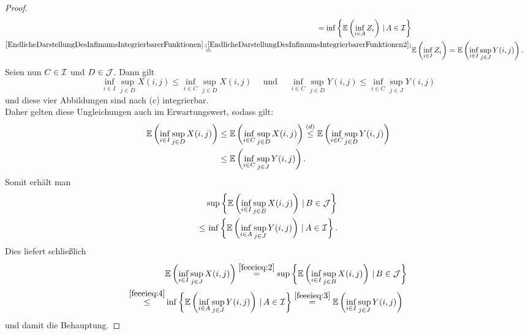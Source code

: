\begin{proof}
\begin{align}
= \inf\menge{\E\left(\inf_{i \in A}Z_i \right)}{A \in \mci}\notag\\
\overset{\refclaim{EndlicheDarstellungDesInfimumsIntegrierbarerFunktionen}
{EndlicheDarstellungDesInfimumsIntegrierbarerFunktionen2}}=&
\E\left(\inf_{i\in I}Z_i\right)=\E\left(\inf_{i\in I}\sup_{j\in J}Y(i,j)\right)
\text.\label{feeeieq:3}
\end{align}
Seien nun $C \in \mathcal{I}$ und $D \in \mathcal{J}$. Dann gilt
\[ \inf_{i \in I}\sup_{j \in D}X(i, j) \le \inf_{i \in C}\sup_{j \in D}X(i,j)
\quad \text{ und }\quad  
\inf_{i\in C}\sup_{j\in D}Y(i,j)\le \inf_{i \in C}\sup_{j \in J}Y(i, j)\]
und diese vier Abbildungen sind nach (c) integrierbar.\\
Daher gelten diese Ungleichungen auch im Erwartungswert, sodass gilt:
\begin{align*}
\mathbb{E}\left(\inf_{i \in I}\sup_{j \in D}X(i, j) \right) & \le
\mathbb{E}\left(\inf_{i \in C}\sup_{j \in D}X(i, j) \right) \overset{(d)}\le
\mathbb{E}\left(\inf_{i \in C}\sup_{j \in D}Y(i, j) \right)\\
&\le \mathbb{E}\left(\inf_{i \in C}\sup_{j \in J}Y(i, j) \right)\text.
\end{align*}
Somit erhält man
\begin{align}
&
\sup\left\{\mathbb{E}\left(\inf_{i\in I}\sup_{j\in B}X(i,j)\right)\,|\,B \in \mathcal{J}\right\}\notag\\
\le&\, \inf\left\{\mathbb{E}\left(\inf_{i\in A}\sup_{j\in J}Y(i,j)\right)\,|\,A\in\mathcal{I}\right\}
 \text. \label{feeeieq:4}\end{align}
Dies liefert schließlich
\begin{align*}
& \mathbb{E}\left(\inf_{i\in I}\sup_{j\in J}X(i,j)\right) \overset{\eqref{feeeieq:2}}=
\sup\left\{\mathbb{E}\left(\inf_{i \in I}\sup_{j \in B}X(i, j) \right)\,|\,B \in \mathcal{J}\right\}\\
\overset{\eqref{feeeieq:4}}\le &
\inf\left\{\mathbb{E}\left(\inf_{i\in A}\sup_{j\in J}Y(i,j)\right)\,|\,A\in\mathcal{I}\right\}
\overset{\eqref{feeeieq:3}}= \mathbb{E}\left(\inf_{i\in I}\sup_{j\in J}Y(i,j)\right)
\end{align*}
und damit die Behauptung.
\end{proof}
